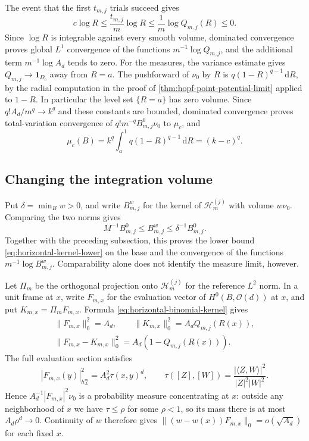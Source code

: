 The event that the first $t_{m,j}$ trials succeed gives
\[
 c\log R\leq\frac{t_{m,j}}m\log R
       \leq\frac1m\log Q_{m,j}(R)\leq0.
\]
Since $\log R$ is integrable against every smooth volume, dominated convergence proves global $L^1$ convergence of the functions $m^{-1}\log Q_{m,j}$, and the additional term $m^{-1}\log A_d$ tends to zero. For the measures, the variance estimate gives $Q_{m,j}\to\mathbf1_{D_c}$ away from $R=a$. The pushforward of $\nu_0$ by $R$ is $q(1-R)^{q-1}\,\mathrm{d}R$, by the radial computation in the proof of \cref{thm:hopf-point-potential-limit} applied to $1-R$. In particular the level set $\{R=a\}$ has zero volume. Since $q!A_d/m^q\to k^q$ and these constants are bounded, dominated convergence proves total-variation convergence of $q!m^{-q}B_{m,j}^0\nu_0$ to $\mu_c$, and
\[
 \mu_c(B)=k^q\int_a^1q(1-R)^{q-1}\,\mathrm{d}R=(k-c)^q.
\]

\subsection{Changing the integration volume}

Put $\delta=\min_Bw>0$, and write $B_{m,j}^w$ for the kernel of $\mathcal H_m^{(j)}$ with volume $w\nu_0$. Comparing the two norms gives
\[
 M^{-1}B_{m,j}^0\leq B_{m,j}^w\leq\delta^{-1}B_{m,j}^0.
\]
Together with the preceding subsection, this proves the lower bound \eqref{eq:horizontal-kernel-lower} on the base and the convergence of the functions $m^{-1}\log B_{m,j}^w$. Comparability alone does not identify the measure limit, however.

Let $\Pi_m$ be the orthogonal projection onto $\mathcal H_m^{(j)}$ for the reference $L^2$ norm. In a unit frame at $x$, write $F_{m,x}$ for the evaluation vector of $H^0(B,\mathcal O(d))$ at $x$, and put $K_{m,x}=\Pi_mF_{m,x}$. Formula \eqref{eq:horizontal-binomial-kernel} gives
\[
 \begin{gathered}
 \|F_{m,x}\|_0^2=A_d,\qquad
 \|K_{m,x}\|_0^2=A_dQ_{m,j}(R(x)),\\
 \|F_{m,x}-K_{m,x}\|_0^2=A_d(1-Q_{m,j}(R(x))).
 \end{gathered}
\]
The full evaluation section satisfies
\[
 |F_{m,x}(y)|_{h_A^m}^2=A_d^2\tau(x,y)^d,\qquad
 \tau([Z],[W])=\frac{|\langle Z,W\rangle|^2}{|Z|^2|W|^2}.
\]
Hence $A_d^{-1}|F_{m,x}|^2\nu_0$ is a probability measure concentrating at $x$: outside any neighborhood of $x$ we have $\tau\leq\rho$ for some $\rho<1$, so its mass there is at most $A_d\rho^d\to0$. Continuity of $w$ therefore gives
$\|(w-w(x))F_{m,x}\|_0=o(\sqrt{A_d})$ for each fixed $x$.

